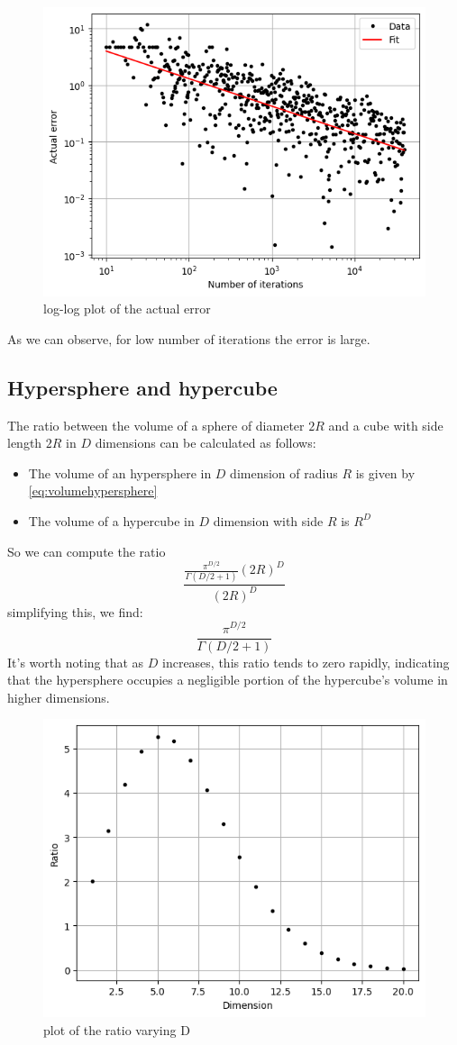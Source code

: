 \documentclass{article}
\begin{document}
\begin{figure}[H]
    \centering
    \includegraphics[width=.7\linewidth]{images/Figure3.1.png}
    \caption{log-log plot of the actual error}
    \label{fig:3.1}
\end{figure}
As we can observe, for low number of iterations the error is large.
\subsection{Hypersphere and hypercube}
The ratio between the volume of a sphere of diameter $2R$ and a cube with side length $2R$ in $D$ dimensions can be calculated as follows:
\begin{itemize}
    \item The volume of an hypersphere in $D$ dimension of radius $R$ is given by \autoref{eq:volumehypersphere}
    \item The volume of a hypercube in $D$ dimension with side $R$ is $R^D$
\end{itemize}
So we can compute the ratio
\begin{equation}
    \frac{\frac{\pi^{D/2}}{\Gamma(D/2+1)}(2R)^D}{(2R)^D}
\end{equation}
simplifying this, we find:
\begin{equation}
     \frac{\pi^{D/2}}{\Gamma(D/2+1)}
\end{equation}
It's worth noting that as $D$ increases, this ratio tends to zero rapidly, indicating that the hypersphere occupies a negligible portion of the hypercube's volume in higher dimensions.
\begin{figure}[H]
    \centering
    \includegraphics[width=.5\linewidth]{images/Figure4.png}
    \caption{plot of the ratio varying D}
    \label{fig:4}
\end{figure}
\end{document}
